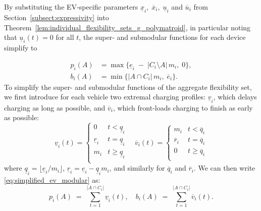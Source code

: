 By substituting the EV‐specific parameters \(\underline{x}_i,\;\overline{x}_i,\;\underline{u}_i\) and \(\overline{u}_i\) from Section~\ref{subsect:expressivity} into 
Theorem~\ref{lem:individual_flexibility_sets_g_polymatroid}, in particular noting that $\underline{u}_i(t) = 0$ for all $t$, the super‐ and submodular functions for each device simplify to

\begin{subequations}\label{eq:simplified_ev_modular}
\begin{align}
    p_i(A) &= \max\bigl\{\underline{e}_i \;-\; \lvert C_i \setminus A\rvert\,m_i,\; 0\bigr\},\\
    b_i(A) &= \min\bigl\{\lvert A \cap C_i\rvert\,m_i,\;\overline{e}_i\bigr\}.
\end{align}
\end{subequations}
To simplify the super- and submodular functions of the aggregate flexibility set, we first introduce for each vehicle two extremal charging profiles: \(\underline{v}_i\), which delays charging as long as possible, and \(\overline{v}_i\), which front‐loads charging to finish as early as possible:
\begin{equation}\label{eq:extremal_charging}
        \underline{v}_i(t) = 
        \begin{cases}
            0                        & t <  \underline{q}_i \\
            \underline{r}_i          & t =  \underline{q}_i \\
            m_i                      & t \geq  \underline{q}_i \\
        \end{cases}
\quad
        \overline{v}_i(t) = 
        \begin{cases}
            m_i                    & t <  \overline{q}_i \\
            \overline{r}_i         & t =  \overline{q}_i \\
            0                      & t \geq \overline{q}_i \\
        \end{cases}
    \end{equation}
where $\underline{q}_i = \lfloor \underline{e}_i / m_i \rfloor$, $\underline{r}_i = \underline{e}_i - \underline{q}_i m_i$, and similarly for $\overline{q}_i$ and $\overline{r}_i$. We can then write \eqref{eq:simplified_ev_modular} as:
\[
    p_i(A) \;=\;\sum_{t=1}^{|A \cap C_i|} \underline{v}_i(t), 
    \quad
    b_i(A) \;=\;\sum_{t=1}^{|A \cap C_i|} \overline{v}_i(t).
\]
